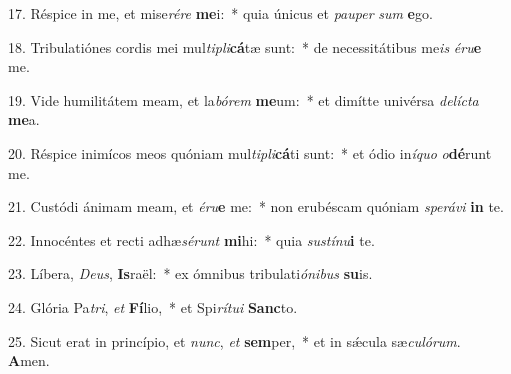 17. Réspice in me, et mise\textit{ré}\textit{re} \textbf{me}i:~*  quia únicus et \textit{pau}\textit{per} \textit{sum} \textbf{e}go.\

18. Tribulatiónes cordis mei mul\textit{ti}\textit{pli}\textbf{cá}tæ sunt:~*  de necessitátibus me\textit{is} \textit{é}\textit{ru}\textbf{e} me.\

19. Vide humilitátem meam, et la\textit{bó}\textit{rem} \textbf{me}um:~*  et dimítte univérsa \textit{de}\textit{líc}\textit{ta} \textbf{me}a.\

20. Réspice inimícos meos quóniam mul\textit{ti}\textit{pli}\textbf{cá}ti sunt:~*  et ódio in\textit{í}\textit{quo} \textit{o}\textbf{dé}runt me.\

21. Custódi ánimam meam, et \textit{é}\textit{ru}\textbf{e} me:~*  non erubéscam quóniam \textit{spe}\textit{rá}\textit{vi} \textbf{in} te.\

22. Innocéntes et recti adhæ\textit{sé}\textit{runt} \textbf{mi}hi:~*  quia \textit{sus}\textit{tí}\textit{nu}\textbf{i} te.\

23. Líbera, \textit{De}\textit{us}, \textbf{Is}raël:~*  ex ómnibus tribulati\textit{ó}\textit{ni}\textit{bus} \textbf{su}is.\

24. Glória Pa\textit{tri}, \textit{et} \textbf{Fí}lio,~*  et Spi\textit{rí}\textit{tu}\textit{i} \textbf{Sanc}to.\

25. Sicut erat in princípio, et \textit{nunc}, \textit{et} \textbf{sem}per,~*  et in sǽcula sæ\textit{cu}\textit{ló}\textit{rum}. \textbf{A}men.\


